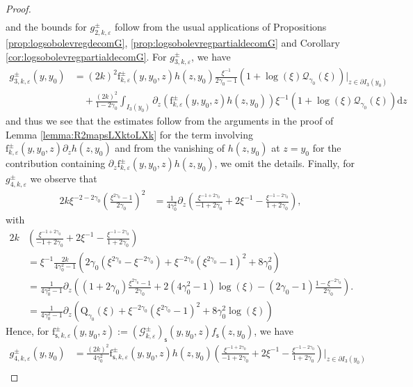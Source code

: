 \documentclass[11pt,reqno]{amsproc}
\theoremstyle{definition}
\numberwithin{equation}{section}
\newcommand{\G}{{\mathcal{G}}}
\newcommand{\Q}{{\mathcal{Q}}}
\newcommand{\s}{{\mathsf{s}}}
\renewcommand{\d}{\mathrm{d}}
\newcommand{\ep}{\varepsilon}
\begin{document}
\begin{proof}
\begin{align*}
\end{align*}
and the bounds for $g_{2,k,\ep}^\pm$ follow from the usual applications of Propositions \ref{prop:logsobolevregdecomG}, \ref{prop:logsobolevregpartialdecomG} and Corollary \ref{cor:logsobolevregpartialdecomG}. For $g_{3,k,\ep}^\pm$, we have
\begin{align*}
g_{3,k,\ep}^\pm(y,y_0) &= (2k)^2 \mathrm{f}_{k,\ep}^\pm(y,y_0,z) h(z,y_0) \frac{\xi^{-1}}{2\gamma_0-1}\left( 1 + \log(\xi)\Q_{\gamma_0}(\xi) \right) \Big|_{z\in \partial I_3(y_0)} \\
&\quad + \frac{(2k)^2}{1-2\gamma_0}\int_{I_3(y_0)} \partial_z \left( \mathrm{f}_{k,\ep}^\pm(y,y_0,z) h(z,y_0) \right) \xi^{-1}(1+\log(\xi) \Q_{\gamma_0}(\xi) ) \d z
\end{align*}
and thus we see that the estimates follow from the arguments in the proof of Lemma \ref{lemma:R2mapsLXktoLXk} for the term involving $\mathrm{f}_{k,\ep}^\pm(y,y_0,z) \partial_z h(z,y_0)$ and from the vanishing of $h(z,y_0)$ at $z=y_0$ for the contribution containing $\partial_z \mathrm{f}_{k,\ep}^\pm(y,y_0,z) h(z,y_0)$, we omit the details. Finally, for $g_{4,k,\ep}^\pm$ we observe that
\begin{align*}
2k\xi^{-2-2\gamma_0}\left( \frac{\xi^{2\gamma_0}-1}{2\gamma_0} \right)^2 &= \frac{1}{4\gamma_0^2} \partial_z \left( \frac{\xi^{-1+2\gamma_0}}{-1+2\gamma_0} +2\xi^{-1} -\frac{\xi^{-1-2\gamma_0}}{1+2\gamma_0} \right),
\end{align*}
with 
\begin{align}
2k& \left( \frac{\xi^{-1+2\gamma_0}}{-1+2\gamma_0} +2\xi^{-1} -\frac{\xi^{-1-2\gamma_0}}{1+2\gamma_0} \right) \\
&= \xi^{-1}\frac{2k}{4\gamma_0^2 -1}\left( 2\gamma_0 \left( \xi^{2\gamma_0} - \xi^{-2\gamma_0} \right) + \xi^{-2\gamma_0}\left( \xi^{2\gamma_0} -1 \right)^2 + 8\gamma_0^2 \right) \label{eq:R3Qpartialz} \\
&= \frac{1}{4\gamma_0^2-1} \partial_z \left( (1+2\gamma_0) \frac{\xi^{2\gamma_0}-1}{2\gamma_0} + 2(4\gamma_0^2 -1)\log(\xi) - (2\gamma_0-1)\frac{1-\xi^{-2\gamma_0}}{2\gamma_0} \right). \\
&= \frac{1}{4\gamma_0^2-1} \partial_z \left( \mathrm{Q}_{\gamma_0}(\xi)  + \xi^{-2\gamma_0}\left( \xi^{2\gamma_0}-1 \right)^2  + 8\gamma_0^2\log(\xi)  \right)\label{eq:R3Qpartialpartialz}
\end{align}
Hence, for $\mathrm{f}_{\s,k,\ep}^\pm(y,y_0,z):=\left( \G_{k,\ep}^\pm \right)_\s(y,y_0,z) f_\s(z,y_0)$, we have
\begin{align*}
g_{4,k,\ep}^\pm(y,y_0) &= \frac{(2k)^2}{4\gamma_0^2}\mathrm{f}_{\s,k,\ep}^\pm(y,y_0,z) h(z,y_0) \left( \frac{\xi^{-1+2\gamma_0}}{-1+2\gamma_0} +2\xi^{-1} -\frac{\xi^{-1-2\gamma_0}}{1+2\gamma_0} \right) \Big|_{z\in \partial I_3(y_0)} \\

\end{align*}
\end{proof}
\end{document}
